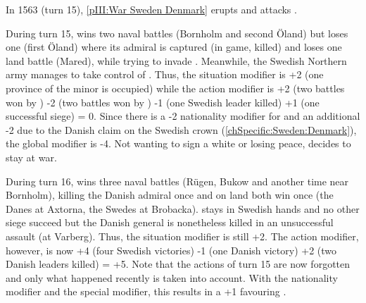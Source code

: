 \begin{exemple}
  In 1563 (turn 15), \ref{pIII:War Sweden Denmark} erupts and \paysDanemark
  attacks \SUE.

  During turn 15, \SUE wins two naval battles (Bornholm and second \"{O}land)
  but loses one (first \"{O}land) where its admiral is captured (in game,
  killed) and loses one land battle (Mared), while trying to invade
  \provinceSkane. Meanwhile, the Swedish Northern army manages to take control
  of \provinceTrondelag. Thus, the situation modifier is +2 (one province of
  the minor is occupied) while the action modifier is +2 (two battles won by
  \SUE) -2 (two battles won by \paysDanemark) -1 (one Swedish leader killed)
  +1 (one successful siege) = 0. Since there is a -2 nationality modifier for
  \paysDanemark and an additional -2 due to the Danish claim on the Swedish
  crown (\ref{chSpecific:Sweden:Denmark}), the global modifier is -4. Not
  wanting to sign a white or losing peace, \SUE decides to stay at war.

  \smallskip

  During turn 16, \SUE wins three naval battles (R\"{u}gen, Bukow and another
  time near Bornholm), killing the Danish admiral once and on land both win
  once (the Danes at Axtorna, the Swedes at Brobacka). \provinceTrondelag
  stays in Swedish hands and no other siege succeed but the Danish general
   is nonetheless killed in an unsuccessful assault (at
  Varberg). Thus, the situation modifier is still +2. The action modifier,
  however, is now +4 (four Swedish victories) -1 (one Danish victory) +2 (two
  Danish leaders killed) = +5. Note that the actions of turn 15 are now
  forgotten and only what happened recently is taken into account. With the
  nationality modifier and the special modifier, this results in a +1
  favouring \SUE.


\end{exemple}
